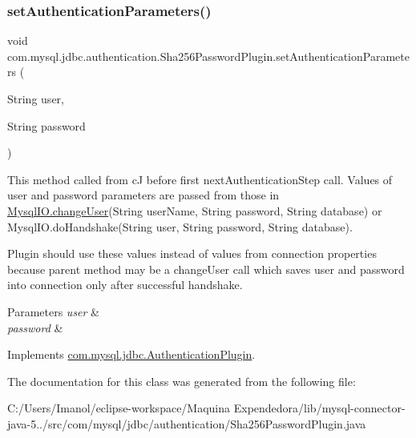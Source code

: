\mbox{\label{classcom_1_1mysql_1_1jdbc_1_1authentication_1_1_sha256_password_plugin_a2aa9fda4aa70184de8f7407854ed0000}} 
\subsubsection{\texorpdfstring{set\+Authentication\+Parameters()}{setAuthenticationParameters()}}
{\footnotesize\ttfamily void com.\+mysql.\+jdbc.\+authentication.\+Sha256\+Password\+Plugin.\+set\+Authentication\+Parameters (\begin{DoxyParamCaption}\item[{String}]{user,  }\item[{String}]{password }\end{DoxyParamCaption})}

This method called from cJ before first next\+Authentication\+Step call. Values of user and password parameters are passed from those in \mbox{\hyperlink{classcom_1_1mysql_1_1jdbc_1_1_mysql_i_o_a2b65fc2cb7cccdb5923da263d37019ad}{Mysql\+I\+O.\+change\+User}}(String user\+Name, String password, String database) or Mysql\+I\+O.\+do\+Handshake(String user, String password, String database).

Plugin should use these values instead of values from connection properties because parent method may be a change\+User call which saves user and password into connection only after successful handshake.


\begin{DoxyParams}{Parameters}
{\em user} & \\
\hline
{\em password} & \\
\hline
\end{DoxyParams}


Implements \mbox{\hyperlink{interfacecom_1_1mysql_1_1jdbc_1_1_authentication_plugin_af47d83abdb04823681f23b027ec19379}{com.\+mysql.\+jdbc.\+Authentication\+Plugin}}.



The documentation for this class was generated from the following file\+:\begin{DoxyCompactItemize}
\item 
C\+:/\+Users/\+Imanol/eclipse-\/workspace/\+Maquina Expendedora/lib/mysql-\/connector-\/java-\/5../src/com/mysql/jdbc/authentication/Sha256\+Password\+Plugin.\+java\end{DoxyCompactItemize}
